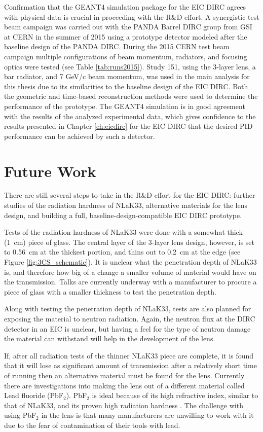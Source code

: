 Confirmation that the GEANT4 simulation package for the EIC DIRC agrees with physical data is crucial in proceeding with the R\&D effort. A synergistic test beam campaign was carried out with the PANDA Barrel DIRC group from GSI at CERN in the summer of 2015 using a prototype detector modeled after the baseline design of the PANDA DIRC. During the 2015 CERN test beam campaign multiple configurations of beam momentum, radiators, and focusing optics were tested (see Table \ref{tab:runs2015}). Study 151, using the 3-layer lens, a bar radiator, and 7 GeV/c beam momentum, was used in the main analysis for this thesis due to its similarities to the baseline design of the EIC DIRC. Both the geometric and time-based reconstruction methods were used to determine the performance of the prototype. The GEANT4 simulation is in good agreement with the results of the analyzed experimental data, which gives confidence to the results presented in Chapter \ref{ch:eicdirc} for the EIC DIRC that the desired PID performance can be achieved by such a detector. 

\section{Future Work}
There are still several steps to take in the R\&D effort for the EIC DIRC: further studies of the radiation hardness of NLaK33, alternative materials for the lens design, and building a full, baseline-design-compatible EIC DIRC prototype.

Tests of the radiation hardness of NLaK33 were done with a somewhat thick (1~cm) piece of glass. The central layer of the 3-layer lens design, however, is set to 0.56~cm at the thickest portion, and thins out to 0.2~cm at the edge (see Figure \ref{fig:3CS_schematic}). It is unclear what the penetration depth of NLaK33 is, and therefore how big of a change a smaller volume of material would have on the transmission. Talks are currently underway with a manufacturer to procure a piece of glass with a smaller thickness to test the penetration depth.

Along with testing the penetration depth of NLaK33, tests are also planned for exposing the material to neutron radiation. Again, the neutron flux at the DIRC detector in an EIC is unclear, but having a feel for the type of neutron damage the material can withstand will help in the development of the lens.

If, after all radiation tests of the thinner NLaK33 piece are complete, it is found that it will lose as significant amount of transmission after a relatively short time of running then an alternative material must be found for the lens. Currently there are investigations into making the lens out of a different material called Lead fluoride (PbF$_2$). PbF$_2$ is ideal because of its high refractive index, similar to that of NLaK33, and its proven high radiation hardness \cite{PbF2RadHard}. The challenge with using PbF$_2$ in the lens is that many manufacturers are unwilling to work with it due to the fear of contamination of their tools with lead.

